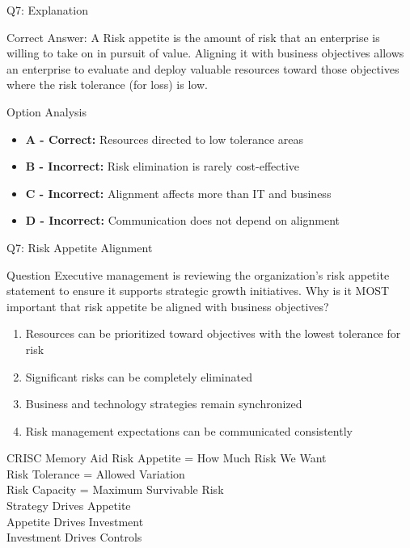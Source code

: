 \documentclass{beamer}
\begin{document}
	\begin{frame}{Q7: Explanation}
		\begin{block}{Correct Answer: A}
			Risk appetite is the amount of risk that an enterprise is willing to take on in pursuit of value. Aligning it with business objectives allows an enterprise to evaluate and deploy valuable resources toward those objectives where the risk tolerance (for loss) is low.
		\end{block}
		\begin{block}{Option Analysis}
			\begin{itemize}
				\item \textbf{A - Correct:} Resources directed to low tolerance areas
				\item \textbf{B - Incorrect:} Risk elimination is rarely cost-effective
				\item \textbf{C - Incorrect:} Alignment affects more than IT and business
				\item \textbf{D - Incorrect:} Communication does not depend on alignment
			\end{itemize}
		\end{block}
	\end{frame}
	
	\begin{frame}[shrink=10]{Q7: Risk Appetite Alignment}
		\begin{block}{Question}
			Executive management is reviewing the organization's risk appetite statement to ensure it supports strategic growth initiatives. Why is it MOST important that risk appetite be aligned with business objectives?
		\end{block}
		\begin{enumerate}
			\item Resources can be prioritized toward objectives with the lowest tolerance for risk
			\item Significant risks can be completely eliminated
			\item Business and technology strategies remain synchronized
			\item Risk management expectations can be communicated consistently
		\end{enumerate}
		\begin{block}{CRISC Memory Aid}
			Risk Appetite = How Much Risk We Want\\
			Risk Tolerance = Allowed Variation\\
			Risk Capacity = Maximum Survivable Risk\\
			Strategy Drives Appetite\\
			Appetite Drives Investment\\
			Investment Drives Controls
		\end{block}
	\end{frame}
	
\end{document}
